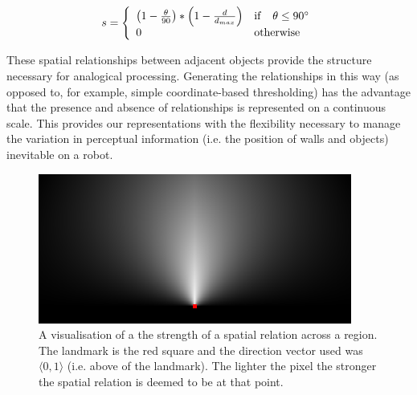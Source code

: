 \begin{equation}
s = \left\{
\begin{array}{l l}
\left(1- \frac{\theta}{90}\right) * \left(1- \frac{d}{d_{max}}\right) & \mathrm{if} \quad \theta \leq 90^{\circ}\\
0 & \mathrm{otherwise}
\end{array} \right.
\label{eq:spatial}
\end{equation}


These spatial relationships between adjacent objects provide the structure necessary for analogical processing. Generating the relationships in this way (as opposed to, for example, simple coordinate-based thresholding) has the advantage that the presence and absence of relationships is represented on a continuous scale. This provides our representations with the flexibility necessary to manage the variation in perceptual information (i.e. the position of walls and objects) inevitable on a robot.

\begin{figure}
\centerline{
\includegraphics[width=\columnwidth]{./images/spatialRelations/xZeroYOne.png}
}
\caption{A visualisation of a the strength of a spatial relation across a region. The landmark is the red square and the direction vector used was $\langle0,1\rangle$ (i.e. above of the landmark). The lighter the pixel the stronger the spatial relation is deemed to be at that point.}
\label{fig:spr}
\end{figure}


